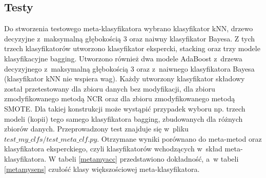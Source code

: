 \subsection{Testy}
Do stworzenia testowego meta-klasyfikatora wybrano klasyfikator kNN, drzewo decyzyjne z~maksymalną głębokością 3 oraz naiwny klasyfikator Bayesa. Z tych trzech klasyfikatorów utworzono klasyfikator ekspercki, stacking oraz trzy modele klasyfikacyjne bagging. Utworzono również dwa modele AdaBoost z~drzewa decyzyjnego z~maksymalną głębokością 3 oraz z~naiwnego klasyfikatora Bayesa (klasyfikator kNN nie wspiera wag). Każdy utworzony klasyfikator składowy został przetestowany dla zbioru danych bez modyfikacji, dla zbioru zmodyfikowanego metodą NCR oraz dla zbioru zmodyfikowanego metodą SMOTE. Dla takiej konstrukcji może wystąpić przypadek wyboru np. trzech modeli (kopii) tego samego klasyfikatora bagging, zbudowanych dla różnych zbiorów danych. Przeprowadzony test znajduje się w~pliku $test\_my\_clfs/test\_meta\_clf.py$. Otrzymane wyniki porównano do meta-metod oraz klasyfikatora eksperckiego, czyli klasyfikatorów wchodzących w~skład meta-klasyfikatora. W tabeli \ref{metamyacc} przedstawiono dokładność, a~w tabeli \ref{metamysens} czułość klasy większościowej meta-klasyfikatora.
